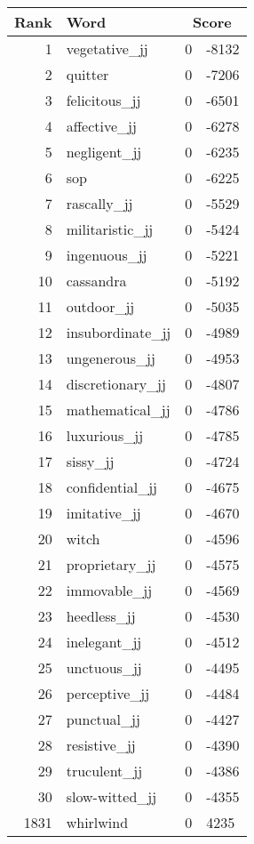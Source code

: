 \begin{longtable}[!htbp]{| rlr@{.}l |}
    \hline
    \textbf{Rank} & \textbf{Word} & \multicolumn{2}{c|}{\textbf{Score}} \\
    \hline
    \endhead
    1 & vegetative\_jj & 0 & -8132 \\
    2 & quitter & 0 & -7206 \\
    3 & felicitous\_jj & 0 & -6501 \\
    4 & affective\_jj & 0 & -6278 \\
    5 & negligent\_jj & 0 & -6235 \\
    6 & sop & 0 & -6225 \\
    7 & rascally\_jj & 0 & -5529 \\
    8 & militaristic\_jj & 0 & -5424 \\
    9 & ingenuous\_jj & 0 & -5221 \\
    10 & cassandra & 0 & -5192 \\
    11 & outdoor\_jj & 0 & -5035 \\
    12 & insubordinate\_jj & 0 & -4989 \\
    13 & ungenerous\_jj & 0 & -4953 \\
    14 & discretionary\_jj & 0 & -4807 \\
    15 & mathematical\_jj & 0 & -4786 \\
    16 & luxurious\_jj & 0 & -4785 \\
    17 & sissy\_jj & 0 & -4724 \\
    18 & confidential\_jj & 0 & -4675 \\
    19 & imitative\_jj & 0 & -4670 \\
    20 & witch & 0 & -4596 \\
    21 & proprietary\_jj & 0 & -4575 \\
    22 & immovable\_jj & 0 & -4569 \\
    23 & heedless\_jj & 0 & -4530 \\
    24 & inelegant\_jj & 0 & -4512 \\
    25 & unctuous\_jj & 0 & -4495 \\
    26 & perceptive\_jj & 0 & -4484 \\
    27 & punctual\_jj & 0 & -4427 \\
    28 & resistive\_jj & 0 & -4390 \\
    29 & truculent\_jj & 0 & -4386 \\
    30 & slow-witted\_jj & 0 & -4355 \\
    1831 & whirlwind & 0 & 4235 \\

\end{longtable}
